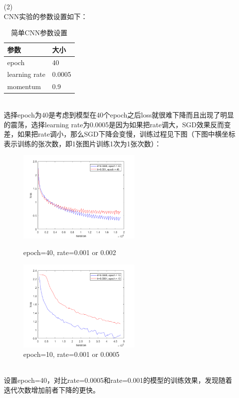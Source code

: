 \documentclass[a4paper,UTF8]{article}
\numberwithin{equation}{section}
\begin{document}
\begin{enumerate}
\item [(2)]
~\\
CNN实验的参数设置如下：
\begin{table}[h]
	\centering
	\caption{简单CNN参数设置}
	\label{cllnet}
	\begin{tabular}{| l | l |}
		\hline
	参数 & 大小 \\ \hline
	epoch	& 40 \\ \hline
	learning rate	& 0.0005 \\ \hline
	momentum	& 0.9 \\ \hline
	\end{tabular}
\end{table}\\
选择epoch为40是考虑到模型在40个epoch之后loss就很难下降而且出现了明显的震荡，选择learning rate为0.0005是因为如果把rate调大，SGD效果反而变差，如果把rate调小，那么SGD下降会变慢，训练过程见下图（下图中横坐标表示训练的张次数，即1张图片训练1次为1张次数）：\\
\begin{figure}[htbp]
	\centering
	\begin{minipage}[t]{0.48\textwidth}
		\centering
		\includegraphics[width=6cm]{net-0005-001-40.png}
		\caption{epoch=40, rate=0.001 or 0.002}
	\end{minipage}
	\begin{minipage}[t]{0.48\textwidth}
		\centering
		\includegraphics[width=6cm]{net-0005-0001-10.png}
		\caption{epoch=10, rate=0.001 or 0.0005}
	\end{minipage}
\end{figure}\\
设置epoch=40，对比rate=0.0005和rate=0.001的模型的训练效果，发现随着迭代次数增加前者下降的更快。\\

\end{enumerate}
\end{document}
